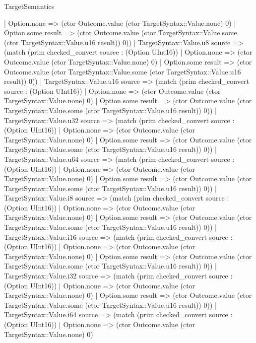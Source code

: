 \begin{lexlean}{TargetSemantics}
\begin{semanticmodule}
{              | Option.none => (ctor Outcome.value (ctor TargetSyntax::Value.none) 0)
              | Option.some result => (ctor Outcome.value (ctor TargetSyntax::Value.some (ctor TargetSyntax::Value.u16 result)) 0))
            | TargetSyntax::Value.u8 source => (match (prim checked_convert source : (Option UInt16))
              | Option.none => (ctor Outcome.value (ctor TargetSyntax::Value.none) 0)
              | Option.some result => (ctor Outcome.value (ctor TargetSyntax::Value.some (ctor TargetSyntax::Value.u16 result)) 0))
            | TargetSyntax::Value.u16 source => (match (prim checked_convert source : (Option UInt16))
              | Option.none => (ctor Outcome.value (ctor TargetSyntax::Value.none) 0)
              | Option.some result => (ctor Outcome.value (ctor TargetSyntax::Value.some (ctor TargetSyntax::Value.u16 result)) 0))
            | TargetSyntax::Value.u32 source => (match (prim checked_convert source : (Option UInt16))
              | Option.none => (ctor Outcome.value (ctor TargetSyntax::Value.none) 0)
              | Option.some result => (ctor Outcome.value (ctor TargetSyntax::Value.some (ctor TargetSyntax::Value.u16 result)) 0))
            | TargetSyntax::Value.u64 source => (match (prim checked_convert source : (Option UInt16))
              | Option.none => (ctor Outcome.value (ctor TargetSyntax::Value.none) 0)
              | Option.some result => (ctor Outcome.value (ctor TargetSyntax::Value.some (ctor TargetSyntax::Value.u16 result)) 0))
            | TargetSyntax::Value.i8 source => (match (prim checked_convert source : (Option UInt16))
              | Option.none => (ctor Outcome.value (ctor TargetSyntax::Value.none) 0)
              | Option.some result => (ctor Outcome.value (ctor TargetSyntax::Value.some (ctor TargetSyntax::Value.u16 result)) 0))
            | TargetSyntax::Value.i16 source => (match (prim checked_convert source : (Option UInt16))
              | Option.none => (ctor Outcome.value (ctor TargetSyntax::Value.none) 0)
              | Option.some result => (ctor Outcome.value (ctor TargetSyntax::Value.some (ctor TargetSyntax::Value.u16 result)) 0))
            | TargetSyntax::Value.i32 source => (match (prim checked_convert source : (Option UInt16))
              | Option.none => (ctor Outcome.value (ctor TargetSyntax::Value.none) 0)
              | Option.some result => (ctor Outcome.value (ctor TargetSyntax::Value.some (ctor TargetSyntax::Value.u16 result)) 0))
            | TargetSyntax::Value.i64 source => (match (prim checked_convert source : (Option UInt16))
              | Option.none => (ctor Outcome.value (ctor TargetSyntax::Value.none) 0)
}
\end{semanticmodule}
\end{lexlean}

